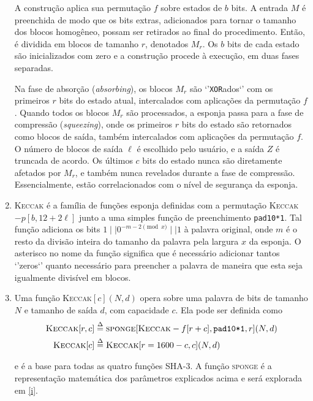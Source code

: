 \documentclass{article}
\begin{document}
\begin{enumerate}[label=(\alph*)]
A construção aplica sua permutação $f$ sobre estados de $b$ bits. A entrada
$M$ é preenchida de modo que os bits extras, adicionados para tornar o tamanho
dos blocos homogêneo, possam ser retirados ao final do procedimento. Então, é
dividida em blocos de tamanho $r$, denotados $M_r$. Os $b$ bits de cada estado
são inicializados com zero e a construção procede à execução, em duas fases
separadas.

Na fase de absorção (\emph{absorbing}), os blocos $M_r$ são `'\verb!XOR!ados`'
com os primeiros $r$ bits do estado atual, intercalados com aplicações da
permutação $f$. Quando todos os blocos $M_r$ são processados, a esponja passa
para a fase de compressão (\emph{squeezing}), onde os primeiros $r$ bits do
estado são retornados como blocos de saída, também intercalados com aplicações
da permutação $f$. O número de blocos de saída $\ell$ é escolhido pelo usuário,
e a saída $Z$ é truncada de acordo. Os últimos $c$ bits do estado nunca são
diretamente afetados por $M_r$, e também nunca revelados durante a fase de
compressão. Essencialmente, estão correlacionados com o nível de segurança da
esponja.

\item \textsc{Keccak} é a família de funções esponja definidas com a
permutação \textsc{Keccak}$-p[b, 12 + 2\ell]$ junto a uma simples função de
preenchimento \texttt{pad10*1}. Tal função adiciona os bits
$1 \mid\mid 0^{-m-2 \pmod{x}} \mid\mid 1$ à palavra original, onde $m$ é o
resto da divisão inteira do tamanho da palavra pela largura $x$ da esponja.
O asterisco no nome da função significa que é necessário adicionar tantos
`'zeros`' quanto necessário para preencher a palavra de maneira que esta
seja igualmente divisível em blocos.

\item Uma função \textsc{Keccak}$[c](N, d)$ opera sobre uma palavra de bits
de tamanho $N$ e tamanho de saída $d$, com capacidade $c$. Ela pode ser
definida como
\begin{align*}
\textsc{Keccak}[r, c] &\stackrel{\Delta}{=}
\textsc{sponge}[\textsc{Keccak}-f[r+c], \texttt{pad10*1}, r](N, d) \\
\textsc{Keccak}[c] &\stackrel{\Delta}{=} \textsc{Keccak}[r = 1600 - c, c](N, d)
\end{align*}

e é a base para todas as quatro funções SHA-3. A função \textsc{sponge} é a
representação matemática dos parâmetros explicados acima e será explorada em
\ref{i}.

\begin{enumerate}[label=\roman*.]


\end{enumerate}
\end{enumerate}
\end{document}
